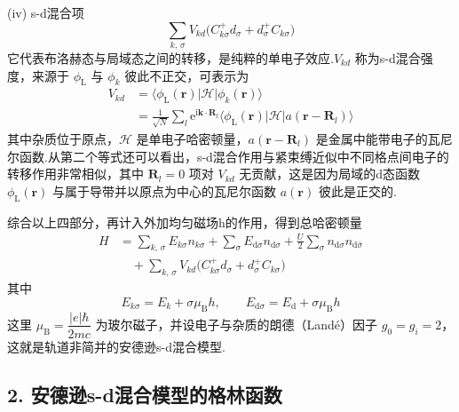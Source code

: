 (iv) s-d混合项
\begin{equation}
  \sum_{k,\,\sigma}V_{kd}
  \bigl(C^{+}_{k\sigma}d_{\sigma}+d^{+}_{\sigma}C_{k\sigma}\bigr)
\end{equation}
它代表布洛赫态与局域态之间的转移，是纯粹的单电子效应.$V_{kd}$ 称为s-d混合强度，来源于 $\phi_{\mathrm{L}}$ 与 $\phi_{k}$ 彼此不正交，可表示为
\begin{equation*}
\begin{aligned}
  V_{kd}&=\langle\phi_{\mathrm{L}}(\boldsymbol{r})|\mathscr{H}|\phi_{k}(\boldsymbol{r})\rangle\\
  &=\frac{1}{\sqrt{N}}\sum_{l}\mathrm{e}^{\mathrm{i}\boldsymbol{k}\cdot\boldsymbol{R}_{l}}
  \langle\phi_{\mathrm{L}}(\boldsymbol{r})|\mathscr{H}
  |a(\boldsymbol{r}-\boldsymbol{R}_{l})\rangle
\end{aligned}
\end{equation*}
其中杂质位于原点，$\mathscr{H}$ 是单电子哈密顿量，$a(\boldsymbol{r}-\boldsymbol{R}_{l})$ 是金属中能带电子的瓦尼尔函数.从第二个等式还可以看出，s-d混合作用与紧束缚近似中不同格点间电子的转移作用非常相似，其中 $\boldsymbol{R}_{l}=0$ 项对 $V_{kd}$ 无贡献，这是因为局域的d态函数 $\phi_{\mathrm{L}}(\boldsymbol{r})$ 与属于导带并以原点为中心的瓦尼尔函数 $a(\boldsymbol{r})$ 彼此是正交的.

综合以上四部分，再计入外加均匀磁场h的作用，得到总哈密顿量
\begin{equation}
\begin{aligned}
  H&=\sum_{k,\,\sigma}E_{k\sigma}n_{k\sigma}
  +\sum_{\sigma}E_{\mathrm{d}\sigma}n_{\mathrm{d}\sigma}
  +\frac{U}{2}\sum_{\sigma}n_{\mathrm{d}\sigma}n_{\mathrm{d}\bar{\sigma}}\\
  &\quad+\sum_{k,\,\sigma}V_{kd}
  \bigl(C^{+}_{k\sigma}d_{\sigma}+d^{+}_{\sigma}C_{k\sigma}\bigr)
\end{aligned}
\end{equation}
其中
\begin{equation}
  E_{k\sigma}=E_{k}+\sigma\mu_{\mathrm{B}}h,
  \qquad E_{\mathrm{d}\sigma}=E_{\mathrm{d}}+\sigma\mu_{\mathrm{B}}h
\end{equation}
这里 $\mu_{\mathrm{B}}=\dfrac{|e|\hbar}{2mc}$ 为玻尔磁子，并设电子与杂质的朗德（Landé）因子 $g_{0}=g_{i}=2$，这就是轨道非简并的安德逊s-d混合模型.

\subsection*{2. 安德逊s-d混合模型的格林函数}


